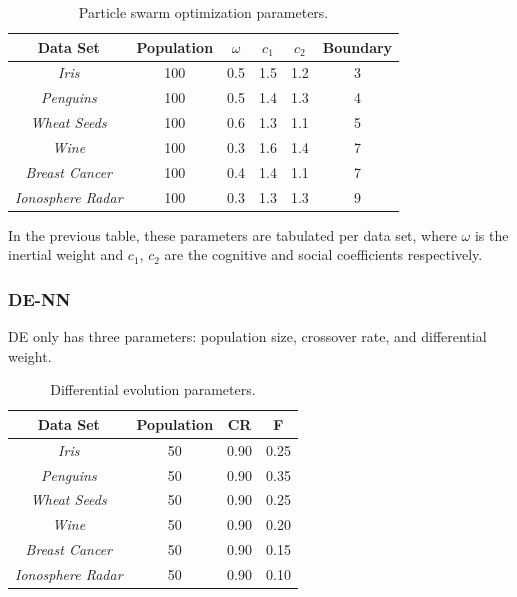 \documentclass[a4paper,12pt]{article}
\begin{document}
\begin{table}[h!]
\centering
\begin{tabular}{|c|c|c|c|c|c|}
\hline
\textbf{Data Set} & \textbf{Population} & \textbf{$\omega$} & \textbf{$c_1$} & \textbf{$c_2$} & \textbf{Boundary} \\ \hline
\textit{Iris} & 100 & 0.5 & 1.5 & 1.2 & 3 \\ \hline
\textit{Penguins} & 100 & 0.5 & 1.4 & 1.3 & 4 \\ \hline
\textit{Wheat Seeds} & 100 & 0.6 & 1.3 & 1.1 & 5 \\ \hline
\textit{Wine} & 100 & 0.3 & 1.6 & 1.4 & 7 \\ \hline
\textit{Breast Cancer} & 100 & 0.4 & 1.4 & 1.1 & 7 \\ \hline
\textit{Ionosphere Radar} & 100 & 0.3 & 1.3 & 1.3 & 9 \\ \hline
\end{tabular}
\caption{Particle swarm optimization parameters.}
\label{Tab:pso-par}
\end{table}

In the previous table, these parameters are tabulated per data set, where $\omega$ is the inertial weight and $c_1$, $c_2$ are the cognitive and social coefficients respectively.

\subsubsection{DE-NN}

DE only has three parameters: population size, crossover rate, and differential weight.

\begin{table}[h!]
\centering
\begin{tabular}{|c|c|c|c|}
\hline
\textbf{Data Set} & \textbf{Population} & \textbf{CR} & \textbf{F} \\ \hline
\textit{Iris} & 50 & 0.90 & 0.25 \\ \hline
\textit{Penguins} & 50 & 0.90 & 0.35 \\ \hline
\textit{Wheat Seeds} & 50 & 0.90 & 0.25 \\ \hline
\textit{Wine} & 50 & 0.90 & 0.20 \\ \hline
\textit{Breast Cancer} & 50 & 0.90 & 0.15 \\ \hline
\textit{Ionosphere Radar} & 50 & 0.90 & 0.10 \\ \hline
\end{tabular}
\caption{Differential evolution parameters.}
\label{Tab:de-par}
\end{table}
\end{document}
